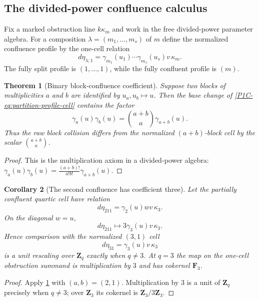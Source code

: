 \documentclass[11pt]{article}
\newtheorem{theorem}{Theorem}[section]
\newtheorem{corollary}[theorem]{Corollary}
\theoremstyle{remark}
\newcommand{\Z}{\mathbf Z}
\newcommand{\F}{\mathbf F}
\begin{document}
\subsection{The divided-power confluence calculus}

Fix a marked obstruction line $k\kappa_m$ and work in the free divided-power parameter algebra.  For a composition $\lambda=(m_1,\ldots,m_s)$ of $m$ define the normalized confluence profile by the one-cell relation
\begin{equation}\label{P1C-eq:partition-profile-cell}
 d\eta_{\lambda;1}
 =\gamma_{m_1}(u_1)\cdots\gamma_{m_s}(u_s)v\,\kappa_m.
\end{equation}
The fully split profile is $(1,\ldots,1)$, while the fully confluent profile is $(m)$.

\begin{theorem}[Binary block-confluence coefficient]\label{P1C-thm:block-confluence-coefficient}
Suppose two blocks of multiplicities $a$ and $b$ are identified by $u_a,u_b\mapsto u$.  Then the base change of \eqref{P1C-eq:partition-profile-cell} contains the factor
\[
 \boxed{
 \gamma_a(u)\gamma_b(u)
 =\binom{a+b}{a}\gamma_{a+b}(u).}
\]
Thus the raw block collision differs from the normalized $(a+b)$-block cell by the scalar $\binom{a+b}{a}$.
\end{theorem}

\begin{proof}
This is the multiplication axiom in a divided-power algebra:
$\gamma_a(u)\gamma_b(u)=\frac{(a+b)!}{a!b!}\gamma_{a+b}(u)$.
\end{proof}

\begin{corollary}[The second confluence has coefficient three]\label{P1C-cor:second-confluence-three}
Let the partially confluent quartic cell have relation
\[
 d\eta_{211}=\gamma_2(u)wv\,\kappa_3.
\]
On the diagonal $w=u$,
\[
 \boxed{
 d\eta_{211}\longmapsto
 3\gamma_3(u)v\,\kappa_3.}
\]
Hence comparison with the normalized $(3,1)$ cell
\[
 d\eta_{31}=\gamma_3(u)v\,\kappa_3
\]
is a unit rescaling over $\Z_q$ exactly when $q\ne3$.  At $q=3$ the map on the one-cell obstruction summand is multiplication by $3$ and has cokernel $\F_3$.
\end{corollary}

\begin{proof}
Apply \cref{P1C-thm:block-confluence-coefficient} with $(a,b)=(2,1)$.  Multiplication by $3$ is a unit of $\Z_q$ precisely when $q\ne3$; over $\Z_3$ its cokernel is $\Z_3/3\Z_3$.
\end{proof}
\end{document}

